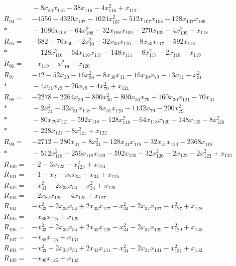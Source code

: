 \begin{align*}
&{}-8x_{83}x_{116}-38x_{116}-4x_{116}^{2}+x_{117}\\[3pt]
R_{94}={}&-4556-4320x_{107}-1024x_{107}^{2}-512x_{107}x_{108}-128x_{107}x_{109}\\*
&{}-1080x_{108}-64x_{108}^{2}-32x_{108}x_{109}-270x_{109}-4x_{109}^{2}+x_{118}\\[3pt]
R_{95}={}&-682-70x_{30}-2x_{30}^{2}-32x_{30}x_{116}-8x_{30}x_{117}-592x_{116}\\*
&{}-128x_{116}^{2}-64x_{116}x_{117}-148x_{117}-8x_{117}^{2}-2x_{118}+x_{119}\\[3pt]
R_{96}={}&-x_{119}-x_{119}^{2}+x_{120}\\[3pt]
R_{97}={}&-42-52x_{30}-16x_{30}^{2}-8x_{30}x_{31}-16x_{30}x_{79}-13x_{31}-x_{31}^{2}\\*
&{}-4x_{31}x_{79}-26x_{79}-4x_{79}^{2}+x_{121}\\[3pt]
R_{98}={}&-2278-2264x_{30}-800x_{30}^{2}-800x_{30}x_{79}-160x_{30}x_{121}-70x_{31}\\*
&{}-2x_{31}^{2}-32x_{31}x_{118}-8x_{31}x_{120}-1132x_{79}-200x_{79}^{2}\\*
&{}-80x_{79}x_{121}-592x_{118}-128x_{118}^{2}-64x_{118}x_{120}-148x_{120}-8x_{120}^{2}\\*
&{}-228x_{121}-8x_{121}^{2}+x_{122}\\[3pt]
R_{99}={}&-2712-280x_{31}-8x_{31}^{2}-128x_{31}x_{118}-32x_{31}x_{120}-2368x_{118}\\*
&{}-512x_{118}^{2}-256x_{118}x_{120}-592x_{120}-32x_{120}^{2}-2x_{122}-2x_{122}^{2}+x_{123}\\[3pt]
R_{100}={}&-2-3x_{123}-x_{123}^{2}+x_{124}\\[3pt]
R_{101}={}&-1-x_{2}-x_{2}x_{34}-x_{34}+x_{125}\\[3pt]
R_{102}={}&-x_{33}^{2}+2x_{33}x_{34}-x_{34}^{2}+x_{126}\\[3pt]
R_{103}={}&-2x_{82}x_{125}-4x_{125}+x_{127}\\[3pt]
R_{104}={}&-x_{33}^{2}+2x_{33}x_{34}+2x_{33}x_{127}-x_{34}^{2}-2x_{34}x_{127}-x_{127}^{2}+x_{128}\\[3pt]
R_{105}={}&-x_{86}x_{125}+x_{129}\\[3pt]
R_{106}={}&-x_{33}^{2}+2x_{33}x_{34}+2x_{33}x_{129}-x_{34}^{2}-2x_{34}x_{129}-x_{129}^{2}+x_{130}\\[3pt]
R_{107}={}&-x_{88}x_{125}+x_{131}\\[3pt]
R_{108}={}&-x_{33}^{2}+2x_{33}x_{34}+2x_{33}x_{131}-x_{34}^{2}-2x_{34}x_{131}-x_{131}^{2}+x_{132}\\[3pt]
R_{109}={}&-x_{90}x_{125}+x_{133}\\[3pt]

\end{align*}
